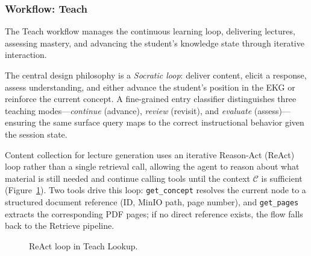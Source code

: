 \subsubsection{Workflow: Teach}\label{subsub:wf_teach}

The Teach workflow manages the continuous learning loop, delivering lectures, assessing mastery, and advancing the student's knowledge state through iterative interaction.



The central design philosophy is a \textit{Socratic loop}: deliver content, elicit a response, assess understanding, and either advance the student's position in the EKG or reinforce the current concept. A fine-grained entry classifier distinguishes three teaching modes---\textit{continue} (advance), \textit{review} (revisit), and \textit{evaluate} (assess)---ensuring the same surface query maps to the correct instructional behavior given the session state.

Content collection for lecture generation uses an iterative Reason-Act (ReAct) loop rather than a single retrieval call, allowing the agent to reason about what material is still needed and continue calling tools until the context $\mathcal{C}$ is sufficient (Figure~\ref{fig:react_teach}). Two tools drive this loop: \texttt{get\_concept} resolves the current node to a structured document reference (ID, MinIO path, page number), and \texttt{get\_pages} extracts the corresponding PDF pages; if no direct reference exists, the flow falls back to the Retrieve pipeline.

\begin{figure}[H]
\centering
{}
    \vspace{12pt}\caption{ReAct loop in Teach Lookup.}\label{fig:react_teach}
\end{figure}

